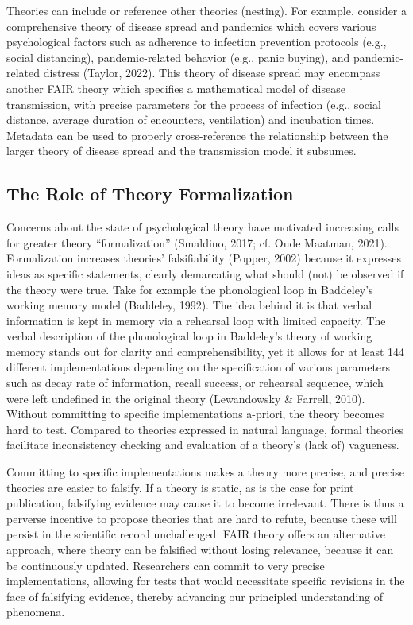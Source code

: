 \documentclass[
  man, noextraspace,floatsintext]{apa7}
\begin{document}
Theories can include or reference other theories (nesting).
For example, consider a comprehensive theory of disease spread and pandemics which covers various psychological factors
such as adherence to infection prevention protocols (e.g., social distancing),
pandemic-related behavior (e.g., panic buying),
and pandemic-related distress
(Taylor, 2022).
This theory of disease spread may encompass another FAIR theory which specifies a mathematical model of disease transmission, with precise parameters for the process of infection (e.g., social distance, average duration of encounters, ventilation) and incubation times.
Metadata can be used to properly cross-reference the relationship between the larger theory of disease spread and the transmission model it subsumes.

\subsection{The Role of Theory Formalization}\label{the-role-of-theory-formalization}

Concerns about the state of psychological theory have motivated increasing calls for greater theory ``formalization'' (Smaldino, 2017; cf. Oude Maatman, 2021).
Formalization increases theories' falsifiability (Popper, 2002) because it expresses ideas as specific statements, clearly demarcating what should (not) be observed if the theory were true.
\label{phonoloop}{Take for example the phonological loop in Baddeley's working memory model (Baddeley, 1992). The idea behind it is that verbal information is kept in memory via a rehearsal loop with limited capacity. The verbal description of the phonological loop in Baddeley's theory of working memory stands out for clarity and comprehensibility, yet it allows for at least 144 different implementations depending on the specification of various parameters such as decay rate of information, recall success, or rehearsal sequence, which were left undefined in the original theory (Lewandowsky \& Farrell, 2010).}
Without committing to specific implementations a-priori,
the theory becomes hard to test.
Compared to theories expressed in natural language,
formal theories facilitate inconsistency checking and evaluation of a theory's (lack of) vagueness.

Committing to specific implementations makes a theory more precise, and precise theories are easier to falsify.
If a theory is static, as is the case for print publication,
falsifying evidence may cause it to become irrelevant.
There is thus a perverse incentive to propose theories that are hard to refute, because these will persist in the scientific record unchallenged.
FAIR theory offers an alternative approach, where theory can be falsified without losing relevance, because it can be continuously updated.
Researchers can commit to very precise implementations,
allowing for tests that would necessitate specific revisions in the face of falsifying evidence,
thereby advancing our principled understanding of phenomena.
\end{document}
